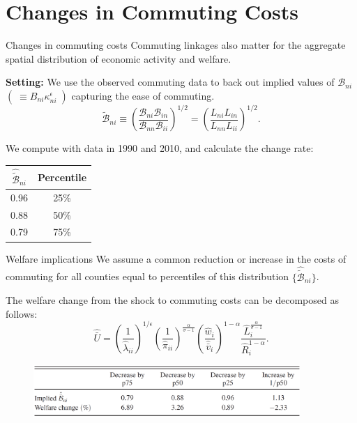 \documentclass{beamer}
\begin{document}
\section{Changes in Commuting Costs}
\begin{frame}[shrink]
	\transfade %
	\tableofcontents[sectionstyle=show/shaded,subsectionstyle=show/shaded/hide]
	\addtocounter{framenumber}{-1}
\end{frame}
\begin{frame}{Changes in commuting costs}
	Commuting linkages also matter for the aggregate spatial distribution of economic activity and welfare.
	\medskip

	\textbf{Setting:} We use the observed commuting data to back out implied values of $\mathcal{B}_{ni}$ $(\;\equiv B_{ni}\kappa_{ni}^\epsilon\;)$ capturing the ease of commuting.
	\begin{equation}
		\tilde{\mathcal{B}}_{ni} \equiv \left(\frac{\mathcal{B}_{ni}\mathcal{B}_{in}}{\mathcal{B}_{nn}\mathcal{B}_{ii}}\right)^{1/2} = \left(\frac{L_{ni}L_{in}}{L_{nn}L_{ii}}\right)^{1/2}.
	\end{equation}
	\medskip

	We compute with data in 1990 and 2010, and calculate the change rate:
	\begin{table}[]
		\begin{tabular}{cc}
		\hline \hline
		$\hat{\tilde{\mathcal{B}}}_{ni}$    & Percentile  \\ \hline
		0.96 & 25\% \\
		0.88 & 50\% \\
		0.79 & 75\% \\ \hline
		\end{tabular}
	\end{table}
\end{frame}
\begin{frame}{Welfare implications}
	We assume a common reduction or increase in the costs of commuting for all counties equal to percentiles of this distribution $\{\hat{\tilde{\mathcal{B}}}_{ni}\}$.
	\medskip

	The welfare change from the shock to commuting costs can be decomposed as follows:
	\begin{equation}
		\hat{\bar{U}} = \left(\frac{1}{\hat{\lambda}_{ii}} \right)^{1/\epsilon}\left(\frac{1}{\hat{\pi}_{ii}}\right)^{\frac{\alpha}{\sigma-1}}\left(\frac{\hat{w}_i}{\hat{\bar{v}}_i}\right)^{1-\alpha}\frac{\hat{L}_i^{\frac{\alpha}{\sigma-1}}}{\hat{R}_i^{1-\alpha}}.
	\end{equation}
	\begin{figure}[htbp]
		\centering
		\includegraphics[width=0.9\textwidth]{tab5.png}
	\end{figure}
\end{frame}
\end{document}
